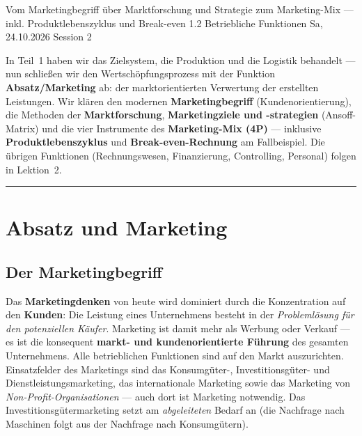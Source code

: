 \documentclass[11pt, a4paper]{article}
\begin{document}
%
  {Vom Marketingbegriff über Marktforschung und Strategie zum Marketing-Mix --- inkl. Produktlebenszyklus und Break-even}%
  {1.2 Betriebliche Funktionen}%
  {Sa, 24.10.2026 \textperiodcentered{} Session 2}

\begin{merksatz}[title={\bfseries Worum geht es in Teil 2?}]
In Teil~1 haben wir das Zielsystem, die Produktion und die Logistik behandelt --- nun
schließen wir den Wertschöpfungsprozess mit der Funktion \textbf{Absatz/Marketing} ab:
der marktorientierten Verwertung der erstellten Leistungen. Wir klären den modernen
\textbf{Marketingbegriff} (Kundenorientierung), die Methoden der \textbf{Marktforschung},
\textbf{Marketingziele und -strategien} (Ansoff-Matrix) und die vier Instrumente des
\textbf{Marketing-Mix (4P)} --- inklusive \textbf{Produktlebenszyklus} und
\textbf{Break-even-Rechnung} am Fallbeispiel. Die übrigen Funktionen (Rechnungswesen,
Finanzierung, Controlling, Personal) folgen in Lektion~2.
\end{merksatz}

\tableofcontents
\vspace{1em}
\hrule
\vspace{1em}

\section{Absatz und Marketing}

\subsection{Der Marketingbegriff}

Das \textbf{Marketingdenken} von heute wird dominiert durch die Konzentration auf den
\textbf{Kunden}: Die Leistung eines Unternehmens besteht in der \emph{Problemlösung für
den potenziellen Käufer}. Marketing ist damit mehr als Werbung oder Verkauf --- es ist
die konsequent \textbf{markt- und kundenorientierte Führung} des gesamten Unternehmens.
Alle betrieblichen Funktionen sind auf den Markt auszurichten. Einsatzfelder des
Marketings sind das Konsumgüter-, Investitionsgüter- und Dienstleistungsmarketing, das
internationale Marketing sowie das Marketing von \emph{Non-Profit-Organisationen} ---
auch dort ist Marketing notwendig. Das Investitionsgütermarketing setzt am
\emph{abgeleiteten} Bedarf an (die Nachfrage nach Maschinen folgt aus der Nachfrage nach
Konsumgütern).
\end{document}
